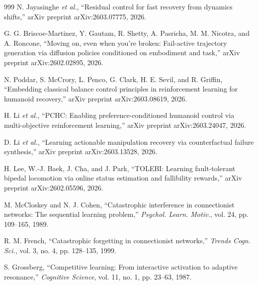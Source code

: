 \documentclass[12pt,a4paper,oneside]{report}
\begin{document}
\begin{thebibliography}{999}
N. Jayasinghe \textit{et al.}, ``Residual control for fast recovery from dynamics shifts,'' arXiv preprint arXiv:2603.07775, 2026.

G. G. Briscoe-Martinez, Y. Gautam, R. Shetty, A. Pasricha, M. M. Nicotra, and A. Roncone, ``Moving on, even when you're broken: Fail-active trajectory generation via diffusion policies conditioned on embodiment and task,'' arXiv preprint arXiv:2602.02895, 2026.

N. Poddar, S. McCrory, L. Penco, G. Clark, H. E. Sevil, and R. Griffin, ``Embedding classical balance control principles in reinforcement learning for humanoid recovery,'' arXiv preprint arXiv:2603.08619, 2026.


H. Li \textit{et al.}, ``{PCHC}: Enabling preference-conditioned humanoid control via multi-objective reinforcement learning,'' arXiv preprint arXiv:2603.24047, 2026.




D. Li \textit{et al.}, ``Learning actionable manipulation recovery via counterfactual failure synthesis,'' arXiv preprint arXiv:2603.13528, 2026.




H. Lee, W.-J. Baek, J. Cha, and J. Park, ``{TOLEBI}: Learning fault-tolerant bipedal locomotion via online status estimation and fallibility rewards,'' arXiv preprint arXiv:2602.05596, 2026.




M. McCloskey and N. J. Cohen, ``Catastrophic interference in connectionist networks: The sequential learning problem,'' \textit{Psychol. Learn. Motiv.}, vol. 24, pp. 109--165, 1989.




R. M. French, ``Catastrophic forgetting in connectionist networks,'' \textit{Trends Cogn. Sci.}, vol. 3, no. 4, pp. 128--135, 1999.




S. Grossberg, ``Competitive learning: From interactive activation to adaptive resonance,'' \textit{Cognitive Science}, vol. 11, no. 1, pp. 23--63, 1987.




\end{thebibliography}
\end{document}
